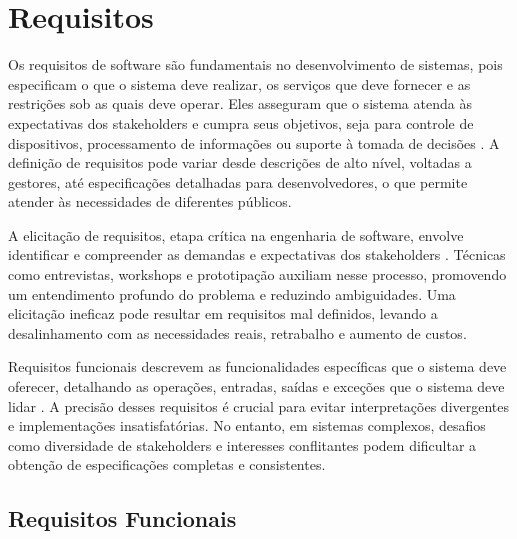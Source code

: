 \section{Requisitos}
\label{sec:requisitos}

Os requisitos de software são fundamentais no desenvolvimento de sistemas, pois especificam o que o sistema deve realizar, os serviços que deve fornecer e as restrições sob as quais deve operar. Eles asseguram que o sistema atenda às expectativas dos stakeholders e cumpra seus objetivos, seja para controle de dispositivos, processamento de informações ou suporte à tomada de decisões \cite{sommerville2011}. A definição de requisitos pode variar desde descrições de alto nível, voltadas a gestores, até especificações detalhadas para desenvolvedores, o que permite atender às necessidades de diferentes públicos.

A elicitação de requisitos, etapa crítica na engenharia de software, envolve identificar e compreender as demandas e expectativas dos stakeholders \cite{sommerville2011}. Técnicas como entrevistas, workshops e prototipação auxiliam nesse processo, promovendo um entendimento profundo do problema e reduzindo ambiguidades. Uma elicitação ineficaz pode resultar em requisitos mal definidos, levando a desalinhamento com as necessidades reais, retrabalho e aumento de custos.

Requisitos funcionais descrevem as funcionalidades específicas que o sistema deve oferecer, detalhando as operações, entradas, saídas e exceções que o sistema deve lidar \cite{sommerville2011}. A precisão desses requisitos é crucial para evitar interpretações divergentes e implementações insatisfatórias. No entanto, em sistemas complexos, desafios como diversidade de stakeholders e interesses conflitantes podem dificultar a obtenção de especificações completas e consistentes.

\subsection{Requisitos Funcionais}

